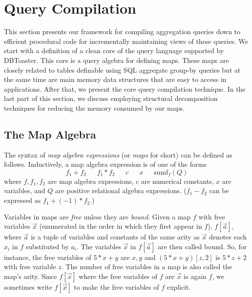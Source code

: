 \section{Query Compilation}


\def\algsum{\mathrm{sum}}
\def\algagg{\mathrm{agg}}
\def\algtop{\mathrm{top}}
\def\algtopk{\mathrm{topk}}



This section presents our framework for compiling aggregation queries down to
efficient procedural code for incrementally maintaining views of these queries.
We start with a definition of a clean
core of the query language supported by DBToaster.
This core is a query algebra for defining maps. These maps are closely related to
tables definable using SQL aggregate group-by queries but at the same time are main
memory data structures that are easy to access in applications.
After that, we present the core query compilation technique.
In the last part of this section, we discuss employing structural decomposition
techniques for reducing the memory consumed by our maps.



\subsection{The Map Algebra}


\def\algsumr{\mbox{sumr}}
\def\algsumf{\mbox{sumf}}
\def\distinct{\mbox{distinct}}
\def\routerjoin{\bowtie\!=}


The syntax of {\em map algebra expressions}\/ (or {\em maps} for short)
can be defined as follows.
Inductively, a map algebra expression is of one of the forms
\[
f_1 + f_2
\quad\;\;
f_1 * f_2
\quad\;\;
c
\quad\;\;
x
\quad\;\;
\algsumf_f(Q)
\]
where $f, f_1, f_2$ are map algebra expressions, $c$ are numerical constants,
$x$ are variables, and $Q$ are positive relational algebra
expressions.
($f_1 - f_2$ can be expressed as $f_1 + (-1) * f_2$.)

Variables in maps are {\em free} unless they are {\em bound}.
Given a map $f$ with free variables $\vec{x}$ (enumerated in the order in which they
first appear in $f$), $f[\vec{a}]$, where $\vec{a}$ is a tuple of variables and constants
of the same arity as $\vec{x}$ denotes each $x_i$ in $f$ substituted by $a_i$. The
variables $\vec{x}$ in $f[\vec{a}]$ are then called bound.
So, for instance, the free variables of $5 * x + y$ are $x,y$ and
$(5 * x + y)[z, 2]$ is $5 * z + 2$ with free variable $z$.
The number of free variables in a map is also called the map's arity.
Since $f[\vec{x}]$ where the free variables of $f$ are $\vec{x}$ is again $f$, we
sometimes write $f[\vec{x}]$ to make the free variables of $f$ explicit.


